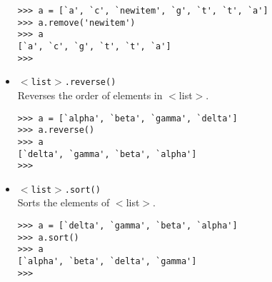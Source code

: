 \begin{itemize}
\begin{lstlisting}
>>> a = [`a', `c', `newitem', `g', `t', `t', `a']
>>> a.remove('newitem')
>>> a
[`a', `c', `g', `t', `t', `a']
>>>
\end{lstlisting}
	\item 
\texttt{$<$list$>$.reverse()}
\\ Reverses the order of     elements in $<$list$>$.      
\begin{lstlisting}
>>> a = [`alpha', `beta', `gamma', `delta']
>>> a.reverse()
>>> a
[`delta', `gamma', `beta', `alpha']
>>>
\end{lstlisting}
	\item 
\texttt{$<$list$>$.sort()}
\\ Sorts the elements of     $<$list$>$.      
\begin{lstlisting}
>>> a = [`delta', `gamma', `beta', `alpha']
>>> a.sort()
>>> a
[`alpha', `beta', `delta', `gamma']
>>>
\end{lstlisting}
\end{itemize}
% 
% 
% 
% 
% 
% 
% 
% 
% 		
% 
% 		
% 


